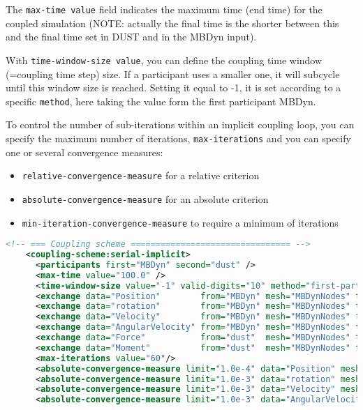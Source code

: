 The \texttt{max-time value} field indicates the maximum time (end time) for the coupled simulation  (NOTE: actually the final time is the shorter between this and the final time set in DUST and in the MBDyn input).

With \texttt{time-window-size value}, you can define the coupling time window (=coupling time step) size. If a participant uses a smaller one, it will subcycle until this window size is reached. 
Setting it equal to -1, it is set according to a specific \texttt{method}, here taking the value form the first participant MBDyn.

To control the number of sub-iterations within an implicit coupling loop, you can specify the maximum number of iterations, \texttt{max-iterations} and you can specify one or several convergence measures:
\begin{itemize}
    \item \texttt{relative-convergence-measure} for a relative criterion
    \item \texttt{absolute-convergence-measure} for an absolute criterion
    \item \texttt{min-iteration-convergence-measure} to require a minimum of iterations
\end{itemize}

\begin{lstlisting}[language=XML]
    <!-- === Coupling scheme ================================ -->
    <coupling-scheme:serial-implicit>
      <participants first="MBDyn" second="dust" />
      <max-time value="100.0" />
      <time-window-size value="-1" valid-digits="10" method="first-participant" />
      <exchange data="Position"        from="MBDyn" mesh="MBDynNodes" to="dust" />
      <exchange data="rotation"        from="MBDyn" mesh="MBDynNodes" to="dust" />
      <exchange data="Velocity"        from="MBDyn" mesh="MBDynNodes" to="dust" />
      <exchange data="AngularVelocity" from="MBDyn" mesh="MBDynNodes" to="dust" />
      <exchange data="Force"           from="dust"  mesh="MBDynNodes" to="MBDyn" />
      <exchange data="Moment"          from="dust"  mesh="MBDynNodes" to="MBDyn" />
      <max-iterations value="60"/>
      <absolute-convergence-measure limit="1.0e-4" data="Position" mesh="MBDynNodes" />
      <absolute-convergence-measure limit="1.0e-3" data="rotation" mesh="MBDynNodes" />
      <absolute-convergence-measure limit="1.0e-3" data="Velocity" mesh="MBDynNodes" />
      <absolute-convergence-measure limit="1.0e-3" data="AngularVelocity" mesh="MBDynNodes" /> 
\end{lstlisting}

